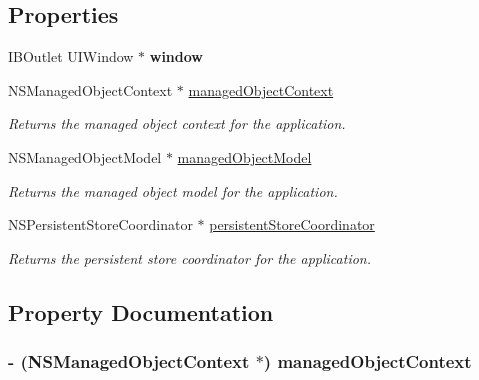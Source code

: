 \subsection*{Properties}
\begin{DoxyCompactItemize}
\item 
\hypertarget{interface_app_delegate___shared_aa4ffafb5fe4a9b73617bf8a9a9c52318}{
IBOutlet UIWindow $\ast$ {\bfseries window}}
\label{interface_app_delegate___shared_aa4ffafb5fe4a9b73617bf8a9a9c52318}

\item 
NSManagedObjectContext $\ast$ \hyperlink{interface_app_delegate___shared_a505c976253a26d42f242cf388c253b2f}{managedObjectContext}
\begin{DoxyCompactList}\small\item\em Returns the managed object context for the application. \end{DoxyCompactList}\item 
NSManagedObjectModel $\ast$ \hyperlink{interface_app_delegate___shared_a6a08f6b55c56fc3b04ad68252ced94fe}{managedObjectModel}
\begin{DoxyCompactList}\small\item\em Returns the managed object model for the application. \end{DoxyCompactList}\item 
NSPersistentStoreCoordinator $\ast$ \hyperlink{interface_app_delegate___shared_a4c656275e182b81c25cc0dadbaa9124c}{persistentStoreCoordinator}
\begin{DoxyCompactList}\small\item\em Returns the persistent store coordinator for the application. \end{DoxyCompactList}\end{DoxyCompactItemize}


\subsection{Property Documentation}
\hypertarget{interface_app_delegate___shared_a505c976253a26d42f242cf388c253b2f}{
\subsubsection[{managedObjectContext}]{\setlength{\rightskip}{0pt plus 5cm}-\/ (NSManagedObjectContext $\ast$) managedObjectContext}}
\label{interface_app_delegate___shared_a505c976253a26d42f242cf388c253b2f}


